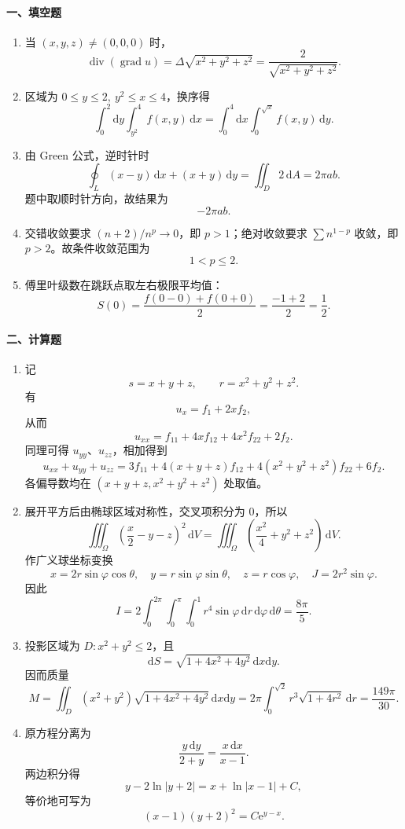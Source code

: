 \paragraph*{一、填空题}
\begin{enumerate}
  \item 当 \((x,y,z)\ne(0,0,0)\) 时，
  \[
    \operatorname{div}(\operatorname{grad}u)=\Delta\sqrt{x^2+y^2+z^2}
    =\frac{2}{\sqrt{x^2+y^2+z^2}}.
  \]
  \item 区域为 \(0\le y\le2,\ y^2\le x\le4\)，换序得
  \[
    \int_0^2\mathrm{d}y\int_{y^2}^{4}f(x,y)\,\mathrm{d}x
    =\int_0^4\mathrm{d}x\int_0^{\sqrt x}f(x,y)\,\mathrm{d}y.
  \]
  \item 由 Green 公式，逆时针时
  \[
    \oint_L(x-y)\,\mathrm{d}x+(x+y)\,\mathrm{d}y
    =\iint_D 2\,\mathrm{d}A=2\pi ab.
  \]
  题中取顺时针方向，故结果为
  \[
    -2\pi ab.
  \]
  \item 交错收敛要求 \((n+2)/n^p\to0\)，即 \(p>1\)；绝对收敛要求 \(\sum n^{1-p}\) 收敛，即 \(p>2\)。故条件收敛范围为
  \[
    1<p\le2.
  \]
  \item 傅里叶级数在跳跃点取左右极限平均值：
  \[
    S(0)=\frac{f(0-0)+f(0+0)}2=\frac{-1+2}{2}=\frac12.
  \]
\end{enumerate}

\paragraph*{二、计算题}
\begin{enumerate}
  \item 记
  \[
    s=x+y+z,\qquad r=x^2+y^2+z^2.
  \]
  有
  \[
    u_x=f_1+2xf_2,
  \]
  从而
  \[
    u_{xx}=f_{11}+4xf_{12}+4x^2f_{22}+2f_2.
  \]
  同理可得 \(u_{yy}\)、\(u_{zz}\)，相加得到
  \[
    u_{xx}+u_{yy}+u_{zz}
    =3f_{11}+4(x+y+z)f_{12}+4(x^2+y^2+z^2)f_{22}+6f_2.
  \]
  各偏导数均在 \((x+y+z,x^2+y^2+z^2)\) 处取值。

  \item 展开平方后由椭球区域对称性，交叉项积分为 \(0\)，所以
  \[
    \iiint_\Omega\left(\frac x2-y-z\right)^2\,\mathrm{d}V
    =\iiint_\Omega\left(\frac{x^2}{4}+y^2+z^2\right)\,\mathrm{d}V.
  \]
  作广义球坐标变换
  \[
    x=2r\sin\varphi\cos\theta,\quad
    y=r\sin\varphi\sin\theta,\quad
    z=r\cos\varphi,\quad J=2r^2\sin\varphi.
  \]
  因此
  \[
    I=2\int_0^{2\pi}\int_0^\pi\int_0^1r^4\sin\varphi\,\mathrm{d}r\,\mathrm{d}\varphi\,\mathrm{d}\theta
    =\frac{8\pi}{5}.
  \]

  \item 投影区域为 \(D:x^2+y^2\le2\)，且
  \[
    \mathrm{d}S=\sqrt{1+4x^2+4y^2}\,\mathrm{d}x\mathrm{d}y.
  \]
  因而质量
  \[
    M=\iint_D(x^2+y^2)\sqrt{1+4x^2+4y^2}\,\mathrm{d}x\mathrm{d}y
    =2\pi\int_0^{\sqrt2}r^3\sqrt{1+4r^2}\,\mathrm{d}r
    =\frac{149\pi}{30}.
  \]

  \item 原方程分离为
  \[
    \frac{y\,\mathrm{d}y}{2+y}=\frac{x\,\mathrm{d}x}{x-1}.
  \]
  两边积分得
  \[
    y-2\ln|y+2|=x+\ln|x-1|+C,
  \]
  等价地可写为
  \[
    (x-1)(y+2)^2=C\mathrm{e}^{y-x}.
  \]
\end{enumerate}

